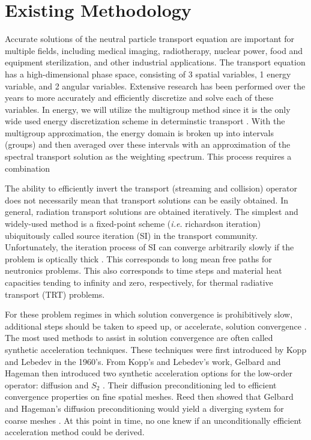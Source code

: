 \documentclass[11pt]{article}
\begin{document}
\section{Existing Methodology}
\label{sec::PS}
Accurate solutions of the neutral particle transport equation are important for multiple fields, including medical imaging, radiotherapy, nuclear power, food and equipment sterilization, and other industrial applications. The transport equation has a high-dimensional phase space, consisting of 3 spatial variables, 1 energy variable, and 2 angular variables. Extensive research has been performed over the years to more accurately and efficiently discretize and solve each of these variables. In energy, we will utilize the multigroup method since it is the only wide used energy discretization scheme in determinstic transport \cite{duderstadt1976nuclear}. With the multigroup approximation, the energy domain is broken up into intervals (groups) and then averaged over these intervals with an approximation of the spectral transport solution as the weighting spectrum. This process requires a combination 

The ability to efficiently invert the transport (streaming and collision) operator does not necessarily mean that transport solutions can be easily obtained. In general, radiation transport solutions are obtained iteratively. The simplest and widely-used method is a fixed-point scheme ({\em i.e.} richardson iteration) ubiquitously called source iteration (SI) in the transport community. Unfortunately, the iteration process of SI can converge arbitrarily slowly if the problem is optically thick \cite{ref::adams_larsen_iter_methods}. This corresponds to long mean free paths for neutronics problems. This also corresponds to time steps and material heat capacities tending to infinity and zero, respectively, for thermal radiative transport (TRT) problems.

For these problem regimes in which solution convergence is prohibitively slow, additional steps should be taken to speed up, or accelerate, solution convergence \cite{ref::adams_larsen_iter_methods}. The most used methods to assist in solution convergence are often called synthetic acceleration techniques. These techniques were first introduced by Kopp  \cite{kopp1963synthetic} and Lebedev \cite{lebedevI} in the 1960's. From Kopp's and Lebedev's work, Gelbard and Hageman then introduced two synthetic acceleration options for the low-order operator: diffusion and $S_2$ \cite{gelbard1969synthetic}. Their diffusion preconditioning led to efficient convergence properties on fine spatial meshes. Reed then showed that Gelbard and Hageman's diffusion preconditioning would yield a diverging system for coarse meshes \cite{reed1971effectiveness}. At this point in time, no one knew if an unconditionally efficient acceleration method could be derived.
\end{document}
